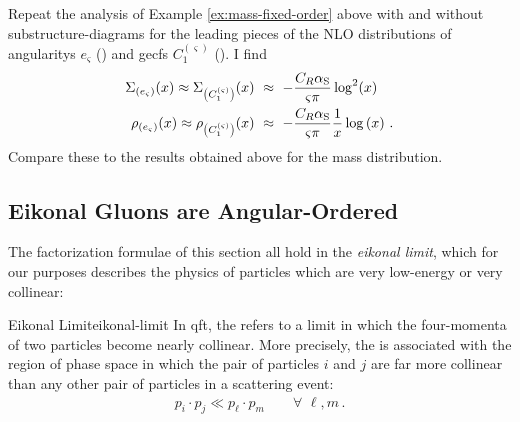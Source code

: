 \begin{exercise}{}
    Repeat the analysis of Example \ref{ex:mass-fixed-order} above with and without \glspl{substructure-diagram} for the leading pieces of the NLO distributions of \glspl{angularity} \(e_\varsigma\) () and \glspl{gecf} \(C_1^{(\varsigma)}\) ().
    I find
    \begin{subequations}
    \begin{align}
        \Sigma_{\left(e_\varsigma\right)}(x)
        \approx
        \Sigma_{\left(C_1^{(\varsigma)}\right)}(x)
        \,\,
        &\approx
        \,\,
        -\frac{C_R\alpha_{\rm S}}{\varsigma \pi}\log^2(x)
        \\
        \rho_{\left(e_\varsigma\right)}(x)
        \approx
        \rho_{\left(C_1^{(\varsigma)}\right)}(x)
        \,\,
        &\approx
        \,\,
        -\frac{C_R\alpha_{\rm S}}{\varsigma \pi} \frac{1}{x}
        \log\left(x\right)
        \,.
    \end{align}
    \end{subequations}
    Compare these to the results obtained above for the mass distribution.
\end{exercise}



\subsection{Eikonal Gluons are Angular-Ordered}
\label{sec:eikonal-limit}

The factorization formulae of this section all hold in the \textit{eikonal limit}, which for our purposes describes the physics of particles which are very low-energy or very collinear:

\begin{definitionbox}{Eikonal Limit}{eikonal-limit}
    In \gls{qft}, the  refers to a limit in which the four-momenta of two particles become nearly collinear.
    More precisely, the  is associated with the region of phase space in which the pair of particles \(i\) and \(j\) are far more collinear than any other pair of particles in a scattering event:
    \begin{align}
        \label{eq:eikonal-limit}
        p_i \cdot p_j \ll p_\ell \cdot p_m\qquad \forall \,\, \ell, m
        \,.
    \end{align}
\end{definitionbox}


